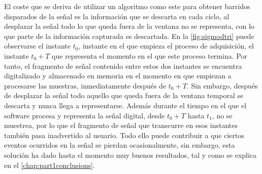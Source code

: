 El coste que se deriva de utilizar un algoritmo como este para obtener
barridos disparados de la señal es la información que se descarta en cada
ciclo, al desplazar la señal todo lo que queda fuera de la ventana no se
representa, con lo que parte de la información capturada es descartada. En
la \cref{fig:sigmodtri} puede observarse el instante $t_0$, instante en el
que empieza el proceso de adquisición, el instante $t_0 + T$ que representa
el momento en el que este proceso termina. Por tanto, el fragmento de señal
contenido entre estos dos instantes se encuentra digitalizado y almacenado
en memoria en el momento en que empiezan a procesarse las muestras,
inmediatamente después de $t_0 + T$. Sin embargo, después de desplazar la
señal todo aquello que queda fuera de la ventana temporal se descarta y
nunca llega a representarse. Además durante el tiempo en el que el software
procesa y representa la señal digital, desde $t_0 + T$ hasta $t_1$, no se
muestrea, por lo que el fragmento de señal que transcurre en esos instantes
también pasa inadvertido al usuario. Todo ello puede contribuir a que
ciertos eventos ocurridos en la señal se pierdan ocasionalmente, sin
embargo, esta solución ha dado hasta el momento muy buenos resultados, tal
y como se explica en el \cref{chap:part1conclusions}.
